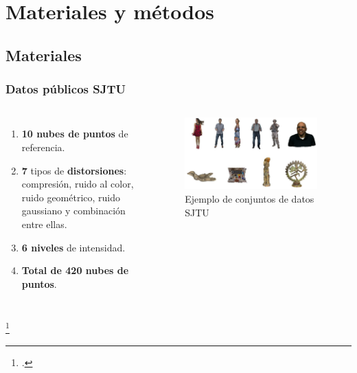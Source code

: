 \section{Materiales y métodos}
\subsection{Materiales}
\begin{frame}
    \frametitle{Datos públicos SJTU}
    \begin{columns}
      \begin{enumerate}
        \item \textbf{10 nubes de puntos} de referencia.  
        \item \textbf{7} tipos de \textbf{distorsiones}: compresión, ruido al color, 
          ruido geométrico, ruido gaussiano y combinación entre ellas.
        \item \textbf{6 niveles} de intensidad.
        \item \textbf{Total de 420 nubes de puntos}.
      \end{enumerate}
      \begin{figure}
        \includegraphics[width=0.95\textwidth]{imagenes/chapter3/SJTU}
        \caption{Ejemplo de conjuntos de datos SJTU\footnotemark}
        \label{fig:SJTU}
      \end{figure}
    \end{columns}
    \footcitetext{SJTU}
\end{frame}

